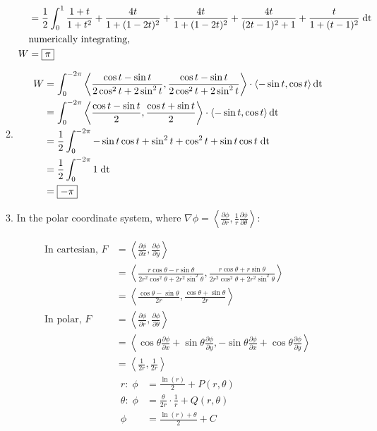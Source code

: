 \documentclass[12pt]{article}
\begin{document}
\begin{enumerate}
\begin{enumerate}
\begin{align*}
            &=\frac{1}{2}\int_0^1\frac{1+t}{1+t^2}+\frac{4t}{1+(1-2t)^2}+\frac{4t}{1+(1-2t)^2}+\frac{4t}{(2t-1)^2+1}+\frac{t}{1+(t-1)^2}\;{\rm dt}\\
            &\text{numerically integrating, }\\
            W&=\boxed{\pi}
        \end{align*}
        \newpage
        \item 
        \begin{align*}
            W&=\int_0^{-2\pi}\left<\frac{\cos t-\sin t}{2\cos^2t+2\sin^2t},\frac{\cos t-\sin t}{2\cos^2t+2\sin^2t}\right>\cdot\left<-\sin t,\cos t\right>{\rm dt}\\
            &=\int_0^{-2\pi}\left<\frac{\cos t-\sin t}{2},\frac{\cos t+\sin t}{2}\right>\cdot\left<-\sin t,\cos t\right>{\rm dt}\\
            &=\frac{1}{2}\int_0^{-2\pi}-\sin t\cos t+\sin^2t+\cos^2t+\sin t\cos t\;{\rm dt}\\
            &=\frac{1}{2}\int_0^{-2\pi}1\;{\rm dt}\\
            &=\boxed{-\pi}
        \end{align*}
        \item In the polar coordinate system, where $\nabla \phi=\left<\frac{\partial \phi}{\partial r},\frac{1}{r}\frac{\partial \phi}{\partial \theta}\right>$:
        \vspace{-10pt}
        \begin{center}
            \begin{align*}
                \text{In cartesian, }F&=\left<\frac{\partial \phi}{\partial x}, \frac{\partial \phi}{\partial y}\right>\\
                &=\left<\frac{r\cos \theta-r\sin \theta}{2r^2\cos^2\theta+2r^2\sin^2\theta},\frac{r\cos \theta+r\sin \theta}{2r^2\cos^2\theta+2r^2\sin^2\theta}\right>\\
                &=\left<\frac{\cos \theta-\sin \theta}{2r},\frac{\cos \theta+\sin \theta}{2r}\right>\\
                \text{In polar, }F&=\left<\frac{\partial \phi}{\partial r}, \frac{\partial \phi}{\partial \theta}\right>\\
                &=\left<\cos\theta\frac{\partial \phi}{\partial x}+\sin\theta\frac{\partial \phi}{\partial y},-\sin\theta\frac{\partial \phi}{\partial x}+\cos\theta\frac{\partial \phi}{\partial y}\right>\\
                &=\left<\frac{1}{2r},\frac{1}{2r}\right>
            \end{align*}
            \vspace{-5pt}
            \begin{align*}
                r:\;\phi&=\frac{\ln(r)}{2}+P(r,\theta)\\
                \theta:\;\phi&=\frac{\theta}{2r}\cdot\frac{1}{r}+Q(r,\theta)\\
                \phi&=\boxed{\frac{\ln(r)+\theta}{2} + C}
            \end{align*}
        \end{center}
        

\end{enumerate}
\end{enumerate}
\end{document}
